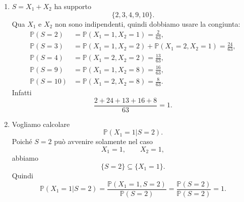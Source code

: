 \documentclass[a4paper]{article}
\begin{document}
\begin{snippetsolution}{}
\begin{enumerate}
\begin{align*}
                = \frac{13}{21}\cdot \frac13 = \frac{13}{63}, \\
                p_{X_1,X_2}(2,8)
                &= \mathbb P(X_1 = 2, X_2 = 8)
                = \mathbb P(X_2 = 8 | X_1 = 2)\mathbb P(X_1 = 2)
                = \frac{8}{21}\cdot \frac13 = \frac{8}{63}.
            \end{align*}
            Controlliamo:
            \[
                \frac{2+24+16+13+8}{63} = 1.
            \]
            Inoltre
            \[
                p_{X_1}(1) = \frac23,
                \qquad
                p_{X_2}(2) = \frac{24}{63}+\frac{13}{63} = \frac{37}{63}.
            \]
            Tuttavia,
            \[
                p_{X_1,X_2}(1,2)
                =
                \frac{24}{63}
                \neq
                \frac23 \cdot \frac{37}{63}
                =
                p_{X_1}(1)p_{X_2}(2).
            \]
            Quindi \(X_1\) e \(X_2\) non sono indipendenti.

        \item \(S = X_1 + X_2\) ha supporto
            \[
                \{2,3,4,9,10\}.
            \]
            Qua \(X_1\) e \(X_2\) non sono indipendenti, quindi dobbiamo usare la congiunta:
            \begin{align*}
                \mathbb P(S=2)
                &= \mathbb P(X_1=1, X_2=1)
                = \frac{2}{63}, \\
                \mathbb P(S=3)
                &= \mathbb P(X_1=1, X_2=2)
                + \mathbb P(X_1=2, X_2=1)
                = \frac{24}{63}, \\
                \mathbb P(S=4)
                &= \mathbb P(X_1=2, X_2=2)
                = \frac{13}{63}, \\
                \mathbb P(S=9)
                &= \mathbb P(X_1=1, X_2=8)
                = \frac{16}{63}, \\
                \mathbb P(S=10)
                &= \mathbb P(X_1=2, X_2=8)
                = \frac{8}{63}.
            \end{align*}
            Infatti
            \[
                \frac{2+24+13+16+8}{63} = 1.
            \]

        \item Vogliamo calcolare
            \[
                \mathbb P(X_1=1 | S=2).
            \]
            Poiché \(S=2\) può avvenire solamente nel caso
            \[
                X_1 = 1, \qquad X_2 = 1,
            \]
            abbiamo
            \[
                \{S=2\} \subseteq \{X_1=1\}.
            \]
            Quindi
            \[
                \mathbb P(X_1=1 | S=2)
                =
                \frac{\mathbb P(X_1=1, S=2)}{\mathbb P(S=2)}
                =
                \frac{\mathbb P(S=2)}{\mathbb P(S=2)}
                =
                1.
            \]
    \end{enumerate}
\end{snippetsolution}
\end{document}
